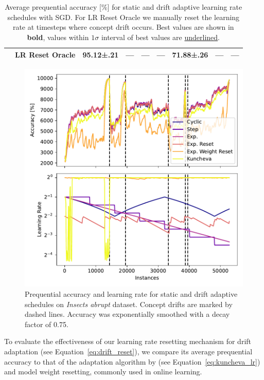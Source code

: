 \documentclass[runningheads]{llncs}
\begin{document}
\begin{table}[ht]
\begin{tabular}{llccccccc}
		                                                    & LR Reset Oracle & 95.12±.21             & ---                 & ---                   & ---                   & 71.88±.26             & ---                   & ---                   \\
		\bottomrule
	\end{tabular}
	\caption{Average prequential accuracy [\%] for static and drift adaptive learning rate schedules with SGD. For LR Reset Oracle we manually reset the learning rate at timesteps where concept drift occurs. Best values are shown in \textbf{bold}, values within $1\sigma$ interval of best values are \underline{underlined}.}
	\label{tab:lr_resetting}
\end{table}

\begin{figure}[ht]
	\centering
	\includegraphics[width=.47\textwidth]{figures/lr_norms_schedules_insects_abrupt.pdf}
	\caption{Prequential accuracy and learning rate for static and drift adaptive  schedules on \textit{Insects abrupt} dataset. Concept drifts are marked by dashed lines. Accuracy was exponentially smoothed with a decay factor of 0.75.}
	\label{fig:prequential_schedulers_insects}
\end{figure}

To evaluate the effectiveness of our learning rate resetting mechanism for drift adaptation (see Equation~\eqref{eq:drift_reset}), we compare its average prequential accuracy to that of the adaptation algorithm by \textcite{kunchevaAdaptiveLearningRate2008} (see Equation~\eqref{eq:kuncheva_lr}) and model weight resetting, commonly used in online learning.
\end{document}

